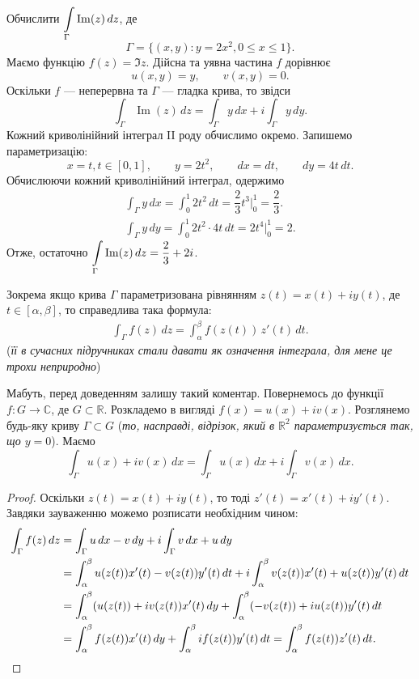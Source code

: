 \documentclass{math_library}
\begin{document}
\begin{example}
Обчислити $\displaystyle\int\displaylimits_{\Gamma} \operatorname{Im}(z) \,dz$, де 
\[
\Gamma=\{(x,y): y=2x^2, 0 \leq x \leq 1 \}.
\]
Маємо функцію $f(z) = \Im z$. Дійсна та уявна частина $f$ дорівнює
\[
u(x,y) = y, \qquad v(x,y) = 0.
\]
Оскільки $f$ --- неперервна та $\Gamma$ --- гладка крива, то звідси
\[
\displaystyle\int_{\Gamma} \operatorname{Im}(z) \,dz = \int_{\Gamma} y\,dx + i \int_{\Gamma}y\,dy.
\]
Кожний криволінійний інтеграл II роду обчислимо окремо. Запишемо параметризацію:
\[
x = t, t \in [0,1],\qquad y = 2t^2, \qquad dx = dt,\qquad dy = 4t\,dt.
\]
Обчислюючи кожний криволінійний інтеграл, одержимо
\begin{align*}
\int_{\Gamma} y\,dx = \int_0^1 2t^2\,dt = \dfrac{2}{3}t^3\Big|_{0}^1 = \dfrac{2}{3}. \\
\int_{\Gamma} y\,dy = \int_0^1 2t^2 \cdot 4t\,dt = 2t^4\Big|_{0}^1 = 2.
\end{align*}
Отже, остаточно $\displaystyle\int\displaylimits_{\Gamma} \operatorname{Im}(z) \,dz = \dfrac{2}{3} + 2i$.
\end{example}

\begin{corollary}
Зокрема якщо крива $\Gamma$ параметризована рівнянням $z(t) = x(t) + i y(t)$, де $t \in [\alpha,\beta]$, то справедлива така формула:
\begin{align*}
\int_\Gamma f(z)\,dz = \int_{\alpha}^{\beta} f(z(t))\, z'(t)\,dt.
\end{align*}
(\textit{її в сучасних підручниках стали давати як означення інтеграла, для мене це трохи неприродно})
\end{corollary}

\begin{remark}
Мабуть, перед доведенням залишу такий коментар. Повернемось до функції $f \colon G \to \mathbb{C}$, де $G \subset \mathbb{R}$. Розкладемо в вигляді $f(x) = u(x) + iv(x)$. Розглянемо будь-яку криву $\Gamma \subset G$ (\textit{то, насправді, відрізок, який в $\mathbb{R}^2$ параметризується так, що $y = 0$}). Маємо
\[
\int_\Gamma u(x) + iv(x)\,dx = \int_\Gamma u(x)\,dx + i \int_\Gamma v(x)\,dx.
\]
\end{remark}

\begin{proof}
Оскільки $z(t) = x(t) + iy(t)$, то тоді $z'(t) = x'(t) + iy'(t)$. Завдяки зауваженню можемо розписати необхідним чином:
\begin{align*}
\int_\Gamma f(z)\,dz & = \int_\Gamma u\,dx - v\,dy + i \int_\Gamma v\,dx + u\,dy \\
& = \int_\alpha^\beta u(z(t)) x'(t) - v(z(t)) y'(t)\,dt + i \int_\alpha^\beta v(z(t)) x'(t) + u(z(t)) y'(t)\,dt \\
& = \int_\alpha^\beta (u(z(t)) + i v(z(t)) x'(t)\,dy + \int_\alpha^\beta (-v(z(t)) + i u(z(t)) y'(t)\,dt \\
& = \int_\alpha^\beta f(z(t)) x'(t)\,dy + \int_\alpha^\beta i f(z(t)) y'(t)\,dt = \int_\alpha^\beta f(z(t)) z'(t)\,dt. \qedhere
\end{align*}
\end{proof}
\end{document}
